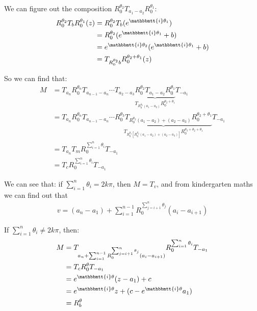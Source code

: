 \documentclass[]{ctexart}
\newcommand{\mi}{\mathbbmtt{i}}
\begin{document}
		We can figure out the composition $R_{0}^{\theta_{2}}T_{a_{1}-a_{2}}R_{0}^{\theta_{1}}$:
			\begin{equation*}
			\begin{aligned}
				R_{0}^{\theta_{2}}T_{b}R_{0}^{\theta_{1}}(z)&=R_{0}^{\theta_{2}}T_{b}(e^{\mi \theta_1})\\
				&=R_{0}^{\theta_{2}}(e^{\mi \theta_1}+b)\\
				&=e^{\mi \theta_2}(e^{\mi \theta_1}+b)\\
				&=T_{R_0^{\theta_{2}}b}R_{0}^{\theta_{2}+\theta_{1}}(z)
			\end{aligned}
			\end{equation*}
			
		So we can find that:
			\begin{equation*}
			\begin{aligned}
				M&=T_{a_{n}}R_{0}^{\theta_{n}}T_{a_{n-1}-a_{n}}\cdots T_{a_{2}-a_{3}}\underbrace{R_{0}^{\theta_{2}}T_{a_{1}-a_{2}}R_{0}^{\theta_{1}}}_{T_{R_0^{\theta_{2}}(a_{1}-a_{2})}R_{0}^{\theta_{2}+\theta_{1}}}T_{-a_{1}}\\
				&=T_{a_{n}}R_{0}^{\theta_{n}}T_{a_{n-1}-a_{n}}\cdots \underbrace{R_{0}^{\theta_{3}}T_{R_0^{\theta_{2}}(a_{1}-a_{2})+(a_{2}-a_{3})}R_{0}^{\theta_{2}+\theta_{1}}}_{T_{R_0^{\theta_{3}}\left[R_0^{\theta_{2}}(a_{1}-a_{2})+(a_{2}-a_{3})\right]}R_{0}^{\theta_{3}+\theta_{2}+\theta_{1}}}T_{-a_{1}}\\
				&=T_{a_{n}}T_{m}R_0^{\sum_{i=1}^{n}\theta_{i}}T_{-a_{1}}\\
				&=T_{c}R_0^{\sum_{i=1}^{n}\theta_{i}}T_{-a_{1}}
			\end{aligned}
			\end{equation*}
		
		We can see that: if $\sum_{i=1}^{n}\theta_{i}=2k\pi $, then $M=T_v$, and from kindergarten maths we can find out that
			\begin{equation*}
			\begin{aligned}
				v=(a_n-a_1)+\sum_{i=1}^{n-1}R_0^{\sum_{j=i+1}^{n}\theta_{j}}(a_{i}-a_{i+1})
			\end{aligned}
			\end{equation*}
			
		If $\sum_{i=1}^{n}\theta_{i}\neq 2k\pi $, then:
			\begin{equation*}
			\begin{aligned}
				M&=T_{a_n+\sum_{i=1}^{n-1}R_0^{\sum_{j=i+1}^{n}\theta_{j}}(a_{i}-a_{i+1})}R_0^{\sum_{i=1}^{n}\theta_{i}}T_{-a_{1}}\\
				&=T_{c}R_0^{\theta}T_{-a_{1}}\\
				&=e^{\mi \theta}(z-a_1)+c\\
				&=e^{\mi \theta}z+(c-e^{\mi \theta}a_1)\\
				&=R_b^{\theta}
			\end{aligned}
			\end{equation*}
			
\end{document}
